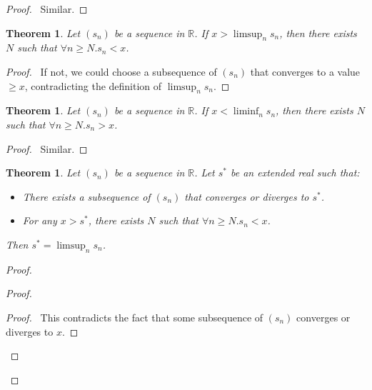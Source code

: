 \documentclass{book}
\let\qed\relax
\newtheorem{thm}[prop]{Theorem}
\theoremstyle{definition}
\begin{document}
\begin{proof}
\pf\ Similar. \qed
\end{proof}

\begin{thm}
Let $(s_n)$ be a sequence in $\mathbb{R}$. If $x > \limsup_n s_n$, then there exists $N$ such that $\forall n \geq N. s_n < x$.
\end{thm}

\begin{proof}
\pf\ If not, we could choose a subsequence of $(s_n)$ that converges to a value $\geq x$, contradicting the definition of $\limsup_n s_n$. \qed
\end{proof}

\begin{thm}
Let $(s_n)$ be a sequence in $\mathbb{R}$. If $x < \liminf_n s_n$, then there exists $N$ such that $\forall n \geq N. s_n > x$.
\end{thm}

\begin{proof}
\pf\ Similar. \qed
\end{proof}

\begin{thm}
\label{thm:limsup}
Let $(s_n)$ be a sequence in $\mathbb{R}$. Let $s^*$ be an extended real such that:
\begin{itemize}
\item There exists a subsequence of $(s_n)$ that converges or diverges to $s^*$.
\item For any $x > s^*$, there exists $N$ such that $\forall n \geq N. s_n < x$.
\end{itemize}
Then $s^* = \limsup_n s_n$.
\end{thm}

\begin{proof}
\pf
{}
\begin{proof}
	\qedstep
	\begin{proof}
		\pf\ This contradicts the fact that some subsequence of $(s_n)$ converges or diverges to $x$.
	\end{proof}
\end{proof}
\qed
\end{proof}
\end{document}
